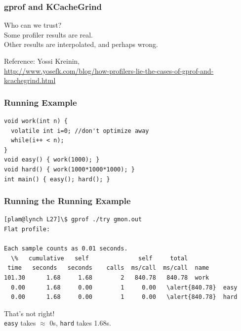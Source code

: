 \begin{frame}
  \frametitle{gprof and KCacheGrind}
  
  
    Who can we trust?\\[1em]

    Some profiler results are real. \\
    Other results are interpolated, and perhaps wrong.
  

  \begin{center}
    Reference: Yossi Kreinin,\\
  \tiny
  \url{http://www.yosefk.com/blog/how-profilers-lie-the-cases-of-gprof-and-kcachegrind.html}
  \end{center}

\end{frame}

\begin{frame}[fragile]
  \frametitle{Running Example}

  \begin{center}
  \begin{minipage}{.7\textwidth}
\begin{lstlisting}
void work(int n) {
  volatile int i=0; //don't optimize away
  while(i++ < n);
}
void easy() { work(1000); }
void hard() { work(1000*1000*1000); }
int main() { easy(); hard(); }
\end{lstlisting}
  \end{minipage}
  \end{center}
  
\end{frame}

\begin{frame}[fragile]
  \frametitle{Running the Running Example}

{\scriptsize
\begin{verbatim}
[plam@lynch L27]\$ gprof ./try gmon.out
Flat profile:

Each sample counts as 0.01 seconds.
  \%   cumulative   self              self     total           
 time   seconds   seconds    calls  ms/call  ms/call  name    
101.30      1.68     1.68        2   840.78   840.78  work
  0.00      1.68     0.00        1     0.00   \alert{840.78}  easy
  0.00      1.68     0.00        1     0.00   \alert{840.78}  hard
\end{verbatim}
}

  That's not right! \\
  {\tt easy} takes $\approx$ 0s, {\tt hard} takes 1.68s.

\end{frame}

